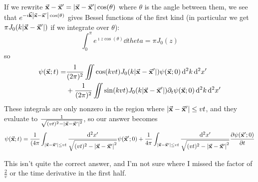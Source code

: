 \documentclass[a4paper,twoside]{article}
\begin{document}
\begin{problem}
    If we rewrite $ \va{x} - \va{x}' = \abs{ \va{x} - \va{x}'} \cos(\theta) $ where $\theta$ is the angle between them, we see that $ e^{- \imath \va{k} \abs{ \va{x} - \va{x}'} \cos(\theta)} $ gives Bessel functions of the first kind (in particular we get $ \pi J_0(k\abs{ \va{x} - \va{x}'}) $ if we integrate over $ \theta $):
    \begin{equation}
        \int_0^{\pi} e^{\imath z \cos(\theta)} \dd{thet a} = \pi J_0(z)
    \end{equation}
    so
    \begin{align}
        \psi( \va{x};t) = &\frac{1}{(2 \pi)^2} \iint \cos(kvt) J_0(k\abs{ \va{x} - \va{x}'}) \psi( \va{x};0) \dd[2]{k} \dd[2]{x'} \\&+ \frac{1}{(2 \pi)^2} \iint \sin(kvt) J_0(k \abs{ \va{x} - \va{x}'}) \partial_t \psi( \va{x};0) \dd[2]{k} \dd[2]{x'}
    \end{align}
    These integrals are only nonzero in the region where $ \abs{ \va{x} - \va{x}'} \leq vt $, and they evaluate to $ \frac{1}{\sqrt{(vt)^2 - \abs{ \va{x} - \va{x}'}^2}} $, so our answer becomes
    \begin{equation}
        \psi( \va{x};t) = \frac{1}{(4 \pi} \int_{\abs{ \va{x} - \va{x}'} \leq vt} \frac{\dd[2]{x'}}{\sqrt{(vt)^2 - \abs{\va{x}-\va{x}'}^2}} \psi( \va{x}';0) + \frac{1}{4 \pi } \int_{\abs{\va{x}-\va{x}'}\leq vt} \frac{\dd[2]{x'}}{\sqrt{(vt)^2 - \abs{\va{x}-\va{x}'}^2}} \pdv{\psi( \va{x}';0)}{t}
    \end{equation}
    
    This isn't quite the correct answer, and I'm not sure where I missed the factor of $ \frac{2}{v} $ or the time derivative in the first half.

\end{problem}
\end{document}
